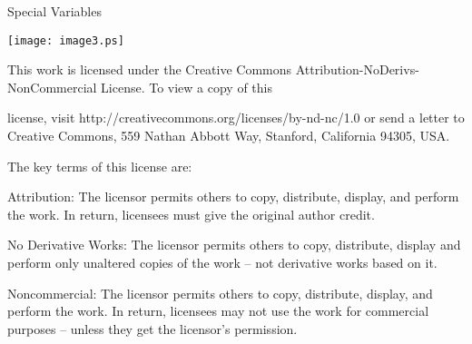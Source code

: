 \documentclass[a4paper,11pt]{book}
\begin{document}
\noindent \eject Special Variables

\noindent \eject 

\noindent \texttt{[image: image3.ps]}

\noindent 

\noindent This work is licensed under the Creative Commons Attribution-NoDerivs-NonCommercial License. To view a copy of this

\noindent license, visit http://creativecommons.org/licenses/by-nd-nc/1.0 or send a letter to Creative Commons, 559 Nathan Abbott Way, Stanford, California 94305, USA.

\noindent 

\noindent The key terms of this license are:

\noindent 

\noindent Attribution: The licensor permits others to copy, distribute, display, and perform the work. In return, licensees must give the original author credit.

\noindent 

\noindent No  Derivative  Works: The licensor permits others to copy, distribute, display and perform only unaltered copies of the work -- not derivative works based on it.

\noindent 

\noindent Noncommercial: The licensor permits others to copy, distribute, display, and perform the work. In return, licensees may not use the work for commercial purposes -- unless they get the licensor's permission.
\end{document}
